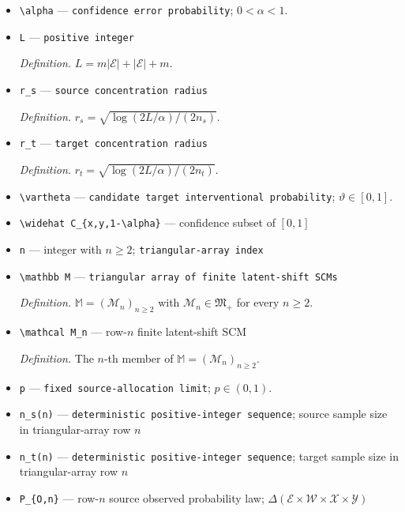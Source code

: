 \documentclass{article}
\begin{document}
\begin{itemize}
  \item \texttt{\textbackslash{}\allowbreak{}alpha} --- \texttt{confidence error probability}; \(0<\alpha<1\).
  \item \texttt{L} --- \texttt{positive integer}
  \par\smallskip\noindent\emph{Definition.} \(L=m\lvert\mathcal E\rvert+\lvert\mathcal E\rvert+m\).
  \item \texttt{r\_\allowbreak{}s} --- \texttt{source concentration radius}
  \par\smallskip\noindent\emph{Definition.} \(r_s=\sqrt{\log(2L/\alpha)/(2n_s)}\).
  \item \texttt{r\_\allowbreak{}t} --- \texttt{target concentration radius}
  \par\smallskip\noindent\emph{Definition.} \(r_t=\sqrt{\log(2L/\alpha)/(2n_t)}\).
  \item \texttt{\textbackslash{}\allowbreak{}vartheta} --- \texttt{candidate target interventional probability}; \(\vartheta\in[0,1]\).
  \item \texttt{\textbackslash{}\allowbreak{}widehat C\_\allowbreak{}\{x,\allowbreak{}y,\allowbreak{}1-\allowbreak{}\textbackslash{}\allowbreak{}alpha\}\allowbreak{}} --- confidence subset of \([0,1]\)
  \item \texttt{n} --- integer with \(n\ge2\); \texttt{triangular-\allowbreak{}array index}
  \item \texttt{\textbackslash{}\allowbreak{}mathbb M} --- \texttt{triangular array of finite latent-\allowbreak{}shift SCMs}
  \par\smallskip\noindent\emph{Definition.} \(\mathbb M=(\mathcal M_n)_{n\ge2}\) with \(\mathcal M_n\in\mathfrak M_{+}\) for every \(n\ge2\).
  \item \texttt{\textbackslash{}\allowbreak{}mathcal M\_\allowbreak{}n} --- row-\(n\) finite latent-shift SCM
  \par\smallskip\noindent\emph{Definition.} The \(n\)-th member of \(\mathbb M=(\mathcal M_n)_{n\ge2}\).
  \item \texttt{p} --- \texttt{fixed source-\allowbreak{}allocation limit}; \(p\in(0,1)\).
  \item \texttt{n\_\allowbreak{}s(n)} --- \texttt{deterministic positive-\allowbreak{}integer sequence}; source sample size in triangular-array row \(n\)
  \item \texttt{n\_\allowbreak{}t(n)} --- \texttt{deterministic positive-\allowbreak{}integer sequence}; target sample size in triangular-array row \(n\)
  \item \texttt{P\_\allowbreak{}\{O,\allowbreak{}n\}\allowbreak{}} --- row-\(n\) source observed probability law; \(\Delta(\mathcal E\times\mathcal W\times\mathcal X\times\mathcal Y)\)

\end{itemize}
\end{document}
